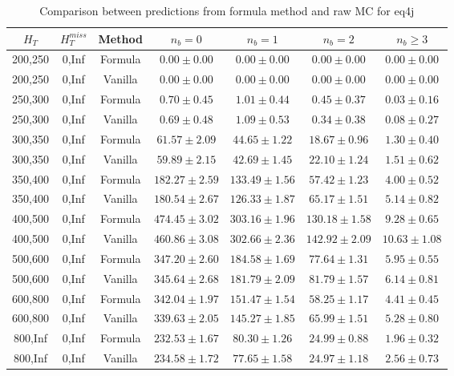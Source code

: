 \begin{longtable}{ | c | c | c | c | c | c | c | }
\caption{Comparison between predictions from formula method and raw MC for eq4j} \label{tab:formula-eq4j} \\    \hline 
$H_{T}$ & $H_{T}^{miss}$ & Method & $n_{b} = 0$ & $n_{b} = 1$ & $n_{b} = 2$ & $n_{b} \ge 3$ \\ \hline200,250 & 0,Inf & Formula  & $     0.00 \pm  0.00 $ & $     0.00 \pm  0.00 $ & $     0.00 \pm  0.00 $ & $     0.00 \pm  0.00 $  \\  
200,250 & 0,Inf & Vanilla  & $     0.00 \pm  0.00 $ & $     0.00 \pm  0.00 $ & $     0.00 \pm  0.00 $ & $     0.00 \pm  0.00 $  \\ \hline 
250,300 & 0,Inf & Formula  & $     0.70 \pm  0.45 $ & $     1.01 \pm  0.44 $ & $     0.45 \pm  0.37 $ & $     0.03 \pm  0.16 $  \\  
250,300 & 0,Inf & Vanilla  & $     0.69 \pm  0.48 $ & $     1.09 \pm  0.53 $ & $     0.34 \pm  0.38 $ & $     0.08 \pm  0.27 $  \\ \hline 
300,350 & 0,Inf & Formula  & $    61.57 \pm  2.09 $ & $    44.65 \pm  1.22 $ & $    18.67 \pm  0.96 $ & $     1.30 \pm  0.40 $  \\  
300,350 & 0,Inf & Vanilla  & $    59.89 \pm  2.15 $ & $    42.69 \pm  1.45 $ & $    22.10 \pm  1.24 $ & $     1.51 \pm  0.62 $  \\ \hline 
350,400 & 0,Inf & Formula  & $   182.27 \pm  2.59 $ & $   133.49 \pm  1.56 $ & $    57.42 \pm  1.23 $ & $     4.00 \pm  0.52 $  \\  
350,400 & 0,Inf & Vanilla  & $   180.54 \pm  2.67 $ & $   126.33 \pm  1.87 $ & $    65.17 \pm  1.51 $ & $     5.14 \pm  0.82 $  \\ \hline 
400,500 & 0,Inf & Formula  & $   474.45 \pm  3.02 $ & $   303.16 \pm  1.96 $ & $   130.18 \pm  1.58 $ & $     9.28 \pm  0.65 $  \\  
400,500 & 0,Inf & Vanilla  & $   460.86 \pm  3.08 $ & $   302.66 \pm  2.36 $ & $   142.92 \pm  2.09 $ & $    10.63 \pm  1.08 $  \\ \hline 
500,600 & 0,Inf & Formula  & $   347.20 \pm  2.60 $ & $   184.58 \pm  1.69 $ & $    77.64 \pm  1.31 $ & $     5.95 \pm  0.55 $  \\  
500,600 & 0,Inf & Vanilla  & $   345.64 \pm  2.68 $ & $   181.79 \pm  2.09 $ & $    81.79 \pm  1.57 $ & $     6.14 \pm  0.81 $  \\ \hline 
600,800 & 0,Inf & Formula  & $   342.04 \pm  1.97 $ & $   151.47 \pm  1.54 $ & $    58.25 \pm  1.17 $ & $     4.41 \pm  0.45 $  \\  
600,800 & 0,Inf & Vanilla  & $   339.63 \pm  2.05 $ & $   145.27 \pm  1.85 $ & $    65.99 \pm  1.51 $ & $     5.28 \pm  0.80 $  \\ \hline 
800,Inf & 0,Inf & Formula  & $   232.53 \pm  1.67 $ & $    80.30 \pm  1.26 $ & $    24.99 \pm  0.88 $ & $     1.96 \pm  0.32 $  \\  
800,Inf & 0,Inf & Vanilla  & $   234.58 \pm  1.72 $ & $    77.65 \pm  1.58 $ & $    24.97 \pm  1.18 $ & $     2.56 \pm  0.73 $  \\ \hline 
    \hline 
    \hline 
\end{longtable}
